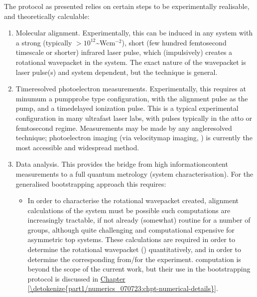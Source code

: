 \documentclass[letterpaper,table,10pt,english]{jupyterBook}
\begin{document}
\sphinxAtStartPar
The protocol as presented relies on certain steps to be experimentally realisable, and theoretically calculable:
\begin{enumerate}
%
\item {} 
\sphinxAtStartPar
Molecular alignment. Experimentally, this can be induced in any system with a strong (typically \(>10^{12}\)\textasciitilde{}Wcm\(^{-2}\)), short (few hundred femtosecond timescale or shorter) infra\sphinxhyphen{}red laser pulse, which (impulsively) creates a rotational wavepacket in the system. The exact nature of the wavepacket is laser pulse(s) and system dependent, but the technique is general.

\item {} 
\sphinxAtStartPar
Time\sphinxhyphen{}resolved photoelectron measurements. Experimentally, this requires \sphinxhyphen{} at minumum \sphinxhyphen{} a pump\sphinxhyphen{}probe type configuration, with the alignment pulse as the pump, and a time\sphinxhyphen{}delayed ionization pulse. This is a typical experimental configuration in many ultrafast laser labs, with pulses typically in the atto\sphinxhyphen{} or femto\sphinxhyphen{}second regime. Measurements may be made by any angle\sphinxhyphen{}resolved technique; photoelectron imaging (via velocity\sphinxhyphen{}map imaging, {\hyperref[\detokenize{backmatter/glossary:term-VMI}]{}}) is currently the most accessible and widespread method.

\item {} 
\sphinxAtStartPar
Data analysis. This provides the bridge from high information\sphinxhyphen{}content measurements to a full quantum
metrology (system characterisation). For the generalised bootstrapping approach this requires:
\begin{itemize}
\item {} 
\sphinxAtStartPar
In order to characterise the rotational wavepacket created, alignment calculations of the system must be possible \sphinxhyphen{} such computations are increasingly tractable, if not already (somewhat) routine for a number of groups, although quite challenging and computational expensive for asymmetric top systems. These calculations are required in order to determine the rotational wavepacket ({\hyperref[\detokenize{backmatter/glossary:term-RWP}]{}}) quantitatively, and in order to determine the corresponding {\hyperref[\detokenize{backmatter/glossary:term-ADMs}]{}} from/for the experiment. {\hyperref[\detokenize{backmatter/glossary:term-RWP}]{}} computation is beyond the scope of the current work, but their use in the bootstrapping protocol is discussed in \hyperref[\detokenize{part1/numerics_070723:chpt-numerical-details}]{Chapter \ref{\detokenize{part1/numerics_070723:chpt-numerical-details}}}.


\end{itemize}
\end{enumerate}
\end{document}
